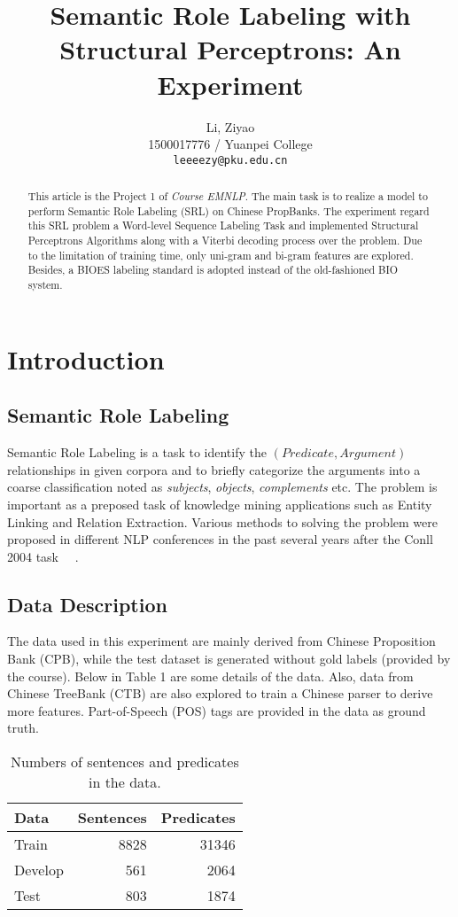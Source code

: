 \documentclass[11pt,a4paper]{article}
\title{Semantic Role Labeling with Structural Perceptrons: An Experiment}
\author{Li, Ziyao \\
  1500017776 / Yuanpei College \\
  {\tt leeeezy@pku.edu.cn}
  }
\date{}
\begin{document}
\maketitle
\begin{abstract}
  This article is the Project 1 of \textit{Course EMNLP}. The main task is to realize a model to perform Semantic Role Labeling (SRL) on Chinese PropBanks. The experiment regard this SRL problem a Word-level Sequence Labeling Task and implemented Structural Perceptrons Algorithms \cite{SP} along with a Viterbi decoding process over the problem. Due to the limitation of training time, only uni-gram and bi-gram features are explored. Besides, a BIOES labeling standard is adopted instead of the old-fashioned BIO system.
\end{abstract}

\section{Introduction}

\subsection{Semantic Role Labeling}
Semantic Role Labeling \citep{conll05} is a task to identify the $(Predicate,Argument)$ relationships in given corpora and to briefly categorize the arguments into a coarse classification noted as \textit{subjects}, \textit{objects}, \textit{complements} etc. The problem is important as a preposed task of knowledge mining applications such as Entity Linking and Relation Extraction. Various methods to solving the problem were proposed in different NLP conferences in the past several years after the Conll 2004 task ~\cite{p1}~\cite{p2}.

\subsection{Data Description}
The data used in this experiment are mainly derived from Chinese Proposition Bank (CPB), while the test dataset is generated without gold labels (provided by the course). Below in Table 1 are some details of the data. Also, data from Chinese TreeBank (CTB) are also explored to train a Chinese parser to derive more features. Part-of-Speech (POS) tags are provided in the data as ground truth.

\begin{table}
\label{tab1}
\centering
\small
\begin{tabular}{lrr}
  Data & Sentences & Predicates\\
  \hline
  Train & 8828 & 31346 \\
  Develop & 561 & 2064 \\
  Test & 803 & 1874 \\
\end{tabular}
\caption{Numbers of sentences and predicates in the data.
  }
\end{table}
\end{document}

